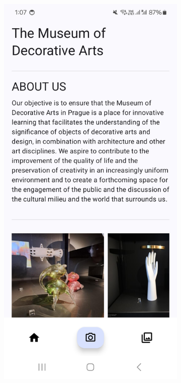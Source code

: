 \begin{figure}[h]
    \centering

    \begin{subfigure}[b]{0.3\textwidth}
        \centering
        \includegraphics[width=\textwidth]{img/home-screen-1.jpg}

\end{subfigure}
\end{figure}
